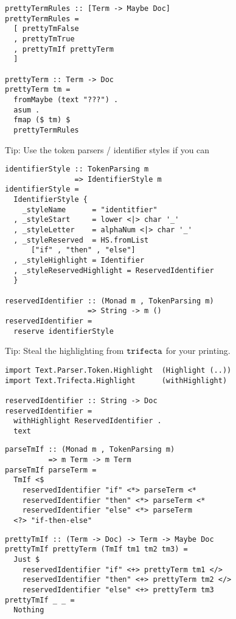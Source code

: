 \documentclass[aspectration=169]{beamer}
\begin{document}
\begin{frame}[fragile]
  \begin{verbatim}
prettyTermRules :: [Term -> Maybe Doc]
prettyTermRules =
  [ prettyTmFalse
  , prettyTmTrue
  , prettyTmIf prettyTerm
  ]

prettyTerm :: Term -> Doc
prettyTerm tm =
  fromMaybe (text "???") .
  asum .
  fmap ($ tm) $
  prettyTermRules
  \end{verbatim}
\end{frame} 

\begin{frame}[fragile]
Tip: Use the token parsers / identifier styles if you can
  \begin{verbatim}
identifierStyle :: TokenParsing m
                => IdentifierStyle m
identifierStyle =
  IdentifierStyle {
    _styleName      = "identitfier"
  , _styleStart     = lower <|> char '_'
  , _styleLetter    = alphaNum <|> char '_'
  , _styleReserved  = HS.fromList 
      ["if" , "then" , "else"]
  , _styleHighlight = Identifier
  , _styleReservedHighlight = ReservedIdentifier
  }

reservedIdentifier :: (Monad m , TokenParsing m)
                   => String -> m ()
reservedIdentifier =
  reserve identifierStyle
  \end{verbatim}
\end{frame} 

\begin{frame}[fragile]
Tip: Steal the highlighting from $\tt{trifecta}$ for your printing.
  \begin{verbatim}
import Text.Parser.Token.Highlight  (Highlight (..))
import Text.Trifecta.Highlight      (withHighlight)

reservedIdentifier :: String -> Doc
reservedIdentifier =
  withHighlight ReservedIdentifier .
  text
  \end{verbatim}
\end{frame} 

\begin{frame}[fragile]
  \begin{verbatim}
parseTmIf :: (Monad m , TokenParsing m)
          => m Term -> m Term
parseTmIf parseTerm =
  TmIf <$
    reservedIdentifier "if" <*> parseTerm <*
    reservedIdentifier "then" <*> parseTerm <*
    reservedIdentifier "else" <*> parseTerm
  <?> "if-then-else"
  \end{verbatim}
\end{frame} 

\begin{frame}[fragile]
  \begin{verbatim}
prettyTmIf :: (Term -> Doc) -> Term -> Maybe Doc
prettyTmIf prettyTerm (TmIf tm1 tm2 tm3) =
  Just $
    reservedIdentifier "if" <+> prettyTerm tm1 </>
    reservedIdentifier "then" <+> prettyTerm tm2 </>
    reservedIdentifier "else" <+> prettyTerm tm3
prettyTmIf _ _ =
  Nothing
  \end{verbatim}
\end{frame} 
\end{document}
